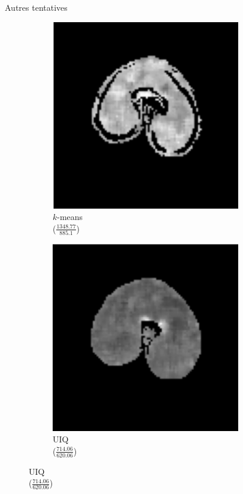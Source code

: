 \documentclass[10pt]{beamer}
\begin{document}
\begin{frame}{Autres tentatives}
\begin{figure}[ht]
\begin{subfigure}[t]{0.31\textwidth}
      \includegraphics[width=0.9\textwidth]{fig/cosine_kmeans}
      \caption{$k$-means\\($\frac{1348.77}{885.1}$)}
      \label{subfig:cosine_kmeans}
    \end{subfigure}%
    \begin{subfigure}[t]{0.31\textwidth}
      \centering
      \includegraphics[width=0.9\textwidth]{fig/cosine_median}
      \caption{UIQ\\($\frac{714.06}{620.06}$)}
      \label{subfig:cosine_uiq}
    \end{subfigure}%

  \end{figure}
\end{frame}
\end{document}
